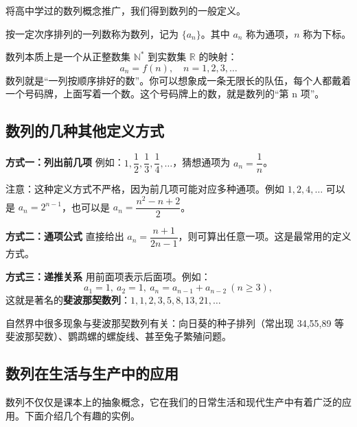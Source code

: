 \documentclass{ctexart}
\newenvironment{custom}[1]{\par\noindent \textbf{#1}\quad}{\par\vspace{1em}}
\begin{document}
将高中学过的数列概念推广，我们得到数列的一般定义。

\begin{definition}[数列]
按一定次序排列的一列数称为数列，记为 \(\{a_n\}\)。其中 \(a_n\) 称为通项，\(n\) 称为下标。
\end{definition}

数列本质上是一个从正整数集 \(\mathbb{N}^*\) 到实数集 \(\mathbb{R}\) 的映射：
\[
a_n = f(n),\quad n=1,2,3,\dots
\]
数列就是“一列按顺序排好的数”。你可以想象成一条无限长的队伍，每个人都戴着一个号码牌，上面写着一个数。这个号码牌上的数，就是数列的“第 n 项”。

\subsection{数列的几种其他定义方式}

\begin{custom}{方式一：列出前几项}
例如：\(1, \dfrac12, \dfrac13, \dfrac14, \dots\)，猜想通项为 \(a_n = \dfrac1n\)。

注意：这种定义方式不严格，因为前几项可能对应多种通项。例如 \(1,2,4,\dots\) 可以是 \(a_n=2^{n-1}\)，也可以是 \(a_n = \dfrac{n^2-n+2}{2}\)。
\end{custom}

\begin{custom}{方式二：通项公式}
直接给出 \(a_n = \dfrac{n+1}{2n-1}\)，则可算出任意一项。这是最常用的定义方式。
\end{custom}

\begin{custom}{方式三：递推关系}
用前面项表示后面项。例如：
\[
a_1 = 1,\ a_2 = 1,\ a_n = a_{n-1} + a_{n-2}\ (n \geq 3),
\]
这就是著名的\textbf{斐波那契数列}：\(1,1,2,3,5,8,13,21,\dots\)

自然界中很多现象与斐波那契数列有关：向日葵的种子排列（常出现 34,55,89 等斐波那契数）、鹦鹉螺的螺旋线、甚至兔子繁殖问题。
\end{custom}

\subsection{数列在生活与生产中的应用}

数列不仅仅是课本上的抽象概念，它在我们的日常生活和现代生产中有着广泛的应用。下面介绍几个有趣的实例。
\end{document}
